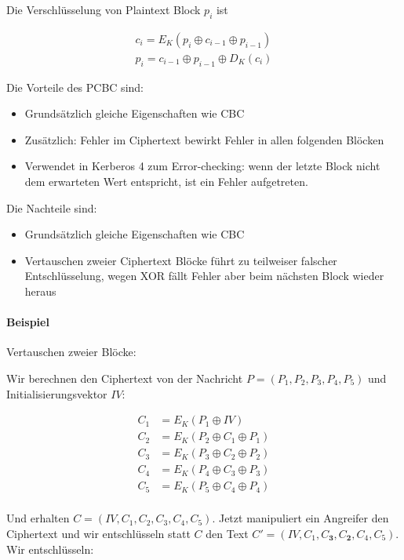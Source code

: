 Die Verschlüsselung von Plaintext Block $p_i$ ist

\begin{align*}
    c_i = E_K(p_i \oplus c_{i-1} \oplus p_{i-1}) \\
    p_i = c_{i-1} \oplus p_{i-1} \oplus D_K(c_i)
\end{align*}

Die Vorteile des PCBC sind: 

\begin{itemize}
    \item Grundsätzlich gleiche Eigenschaften wie CBC
    \item Zusätzlich: Fehler im Ciphertext bewirkt Fehler in allen folgenden Blöcken
    \item Verwendet in Kerberos 4 zum Error-checking: wenn der letzte Block nicht dem erwarteten Wert entspricht, ist ein Fehler aufgetreten.
\end{itemize}

Die Nachteile sind:

\begin{itemize}
    \item Grundsätzlich gleiche Eigenschaften wie CBC
    \item Vertauschen zweier Ciphertext Blöcke führt zu teilweiser falscher Entschlüsselung, wegen XOR fällt Fehler aber beim nächsten Block wieder heraus
\end{itemize}

\paragraph{Beispiel} Vertauschen zweier Blöcke:

Wir berechnen den Ciphertext von der Nachricht $P = (P_1, P_2, P_3, P_4, P_5)$ und Initialisierungsvektor $IV$:

\begin{align*}
    C_1 &= E_K(P_1 \oplus IV) \\
    C_2 &= E_K(P_2 \oplus C_1 \oplus P_1) \\
    C_3 &= E_K(P_3 \oplus C_2 \oplus P_2) \\
    C_4 &= E_K(P_4 \oplus C_3 \oplus P_3) \\
    C_5 &= E_K(P_5 \oplus C_4 \oplus P_4) \\
\end{align*}

Und erhalten $C = (IV, C_1, C_2, C_3, C_4, C_5)$. Jetzt manipuliert ein Angreifer den Ciphertext und wir entschlüsseln statt $C$ den Text 
$C'= (IV, C_1, C_\mathbf{3}, C_\mathbf{2}, C_4, C_5)$. Wir entschlüsseln:

